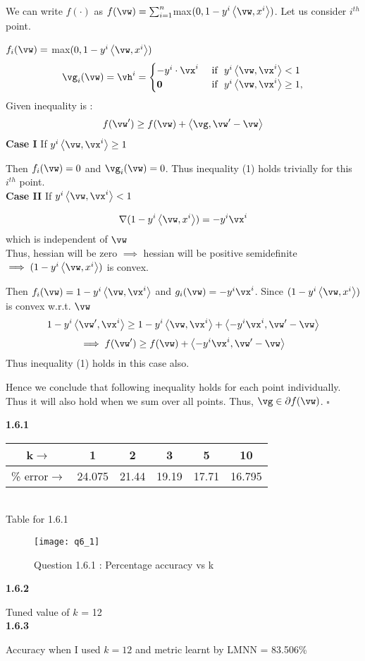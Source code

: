 \documentclass[a4paper,11pt]{article}
\begin{document}
\begin{mlsolution}
We can write $f(\cdot)$ as $f(\vw) = \sum_{i=1}^n$max$(0, 1-y^i\ip{\vw}{x^i}) $. Let us consider $i^{th}$ point.\par
$f_i(\vw) =$ max$(0, 1-y^i\ip{\vw}{x^i})$
\[
\vg_i(\vw) = \vh^i = \begin{cases}
-y^i\cdot\vx^i &\text{ if }\ y^i\ip{\vw}{\vx^i} < 1\\
\vzero &\text{ if }\ y^i\ip{\vw}{\vx^i} \geq 1,
\end{cases}
\]
Given inequality is :
\begin{equation}
f(\vw') \geq f(\vw) + \ip{\vg}{\vw'-\vw}
\end{equation}
\textbf{Case I}
If $y^i\ip{\vw}{\vx^i} \geq 1$\par
Then $f_i(\vw) = 0$ and $\vg_i(\vw)=0$. Thus inequality (1) holds trivially for this $i^{th}$ point.\\
\textbf{Case II} If $y^i\ip{\vw}{\vx^i} < 1$\par
$$\nabla ( 1-y^i\ip{\vw}{x^i} ) = -y^i\vx^i$$ which is independent of $\vw$\\
Thus, hessian will be zero $\implies$ hessian will be positive semidefinite $\implies ( 1-y^i\ip{\vw}{x^i} )$ is convex.

Then $f_i(\vw) = 1-y^i\ip{\vw}{\vx^i}$ and $g_i(\vw) = -y^i\vx^i$. Since $( 1-y^i\ip{\vw}{x^i} )$ is convex w.r.t. $\vw$
 $$1-y^i\ip{\vw^{\prime}}{\vx^i} \geq 1-y^i\ip{\vw}{\vx^i} +  \ip{-y^i\vx^i}{\vw^{\prime}-\vw}$$
 $$\implies f(\vw^{\prime}) \geq f(\vw)+ \ip{-y^i\vx^i}{\vw^{\prime}-\vw}$$
 Thus inequality (1) holds in this case also.\par
Hence we conclude that following inequality holds for each point individually. Thus it will also hold when we sum over all points. Thus, $\vg \in \partial f(\vw)$. \hfill $\square$
\end{mlsolution}

\begin{mlsolution}
\textbf{1.6.1}\par
\begin{center}
\begin{tabular}{ |c|c|c|c|c|c| } 
 \hline
 	k$\rightarrow$ & 1 & 2 & 3 & 5 & 10 \\ 
 	\hline
 \% error$\rightarrow$ & 24.075 & 21.44 & 19.19 & 17.71 & 16.795\\ 
 \hline
\end{tabular}\\
\vspace{0.2cm}
Table for 1.6.1

\end{center}
\begin{figure}[th]%
\begin{center}
\texttt{[image: q6\_1]}%
\end{center}
\caption{Question 1.6.1 : Percentage accuracy vs k}%
\label{fig:proto}%
\end{figure}
\textbf{1.6.2}\par
Tuned value of $k$ = 12\\
\textbf{1.6.3}\par
Accuracy when I used $k=12$ and metric learnt by LMNN = 83.506\%
\end{mlsolution}
					
\end{document}
